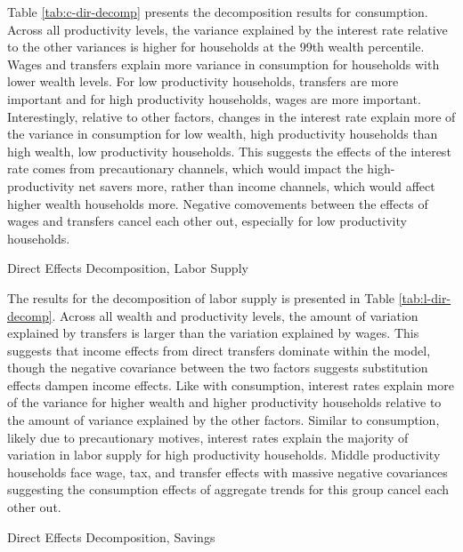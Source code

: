 Table \ref{tab:c-dir-decomp} presents the decomposition results for consumption. Across all productivity levels, the variance explained by the interest rate relative to the other variances is higher for households at the 99th wealth percentile. Wages and transfers explain more variance in consumption for households with lower wealth levels. For low productivity households, transfers are more important and for high productivity households, wages are more important. Interestingly, relative to other factors, changes in the interest rate explain more of the variance in consumption for low wealth, high productivity households than high wealth, low productivity households. This suggests the effects of the interest rate comes from precautionary channels, which would impact the high-productivity net savers more, rather than income channels, which would affect higher wealth households more. Negative comovements between the effects of wages and transfers cancel each other out, especially for low productivity households.

\begin{table}[t]
    \centering
    \caption{Direct Effects Decomposition, Labor Supply}
    
    \label{tab:l-dir-decomp}
\end{table}

The results for the decomposition of labor supply is presented in Table \ref{tab:l-dir-decomp}. Across all wealth and productivity levels, the amount of variation explained by transfers is larger than the variation explained by wages. This suggests that income effects from direct transfers dominate within the model, though the negative covariance between the two factors suggests substitution effects dampen income effects. Like with consumption, interest rates explain more of the variance for higher wealth and higher productivity households relative to the amount of variance explained by the other factors. Similar to consumption, likely due to precautionary motives, interest rates explain the majority of variation in labor supply for high productivity households. Middle productivity households face wage, tax, and transfer effects with massive negative covariances suggesting the consumption effects of aggregate trends for this group cancel each other out.

\begin{table}[t]
    \centering
    \caption{Direct Effects Decomposition, Savings}
    
    \label{tab:b-dir-decomp}
\end{table}

